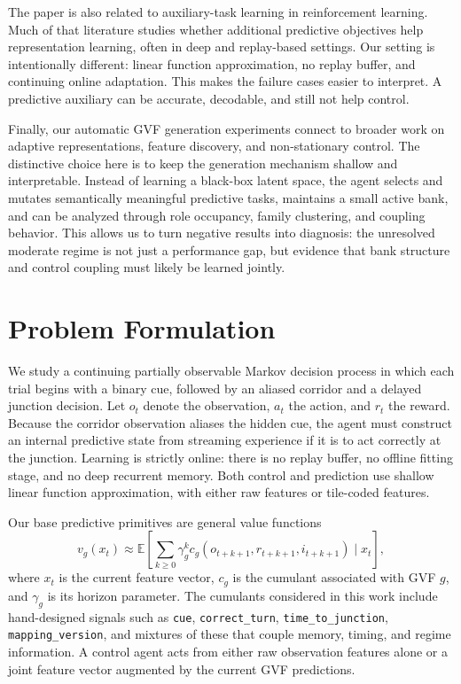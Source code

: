 \documentclass[11pt]{article}
\begin{document}
The paper is also related to auxiliary-task learning in reinforcement learning. Much of that literature studies whether additional predictive objectives help representation learning, often in deep and replay-based settings. Our setting is intentionally different: linear function approximation, no replay buffer, and continuing online adaptation. This makes the failure cases easier to interpret. A predictive auxiliary can be accurate, decodable, and still not help control.

Finally, our automatic GVF generation experiments connect to broader work on adaptive representations, feature discovery, and non-stationary control. The distinctive choice here is to keep the generation mechanism shallow and interpretable. Instead of learning a black-box latent space, the agent selects and mutates semantically meaningful predictive tasks, maintains a small active bank, and can be analyzed through role occupancy, family clustering, and coupling behavior. This allows us to turn negative results into diagnosis: the unresolved moderate regime is not just a performance gap, but evidence that bank structure and control coupling must likely be learned jointly.

\section{Problem Formulation}
We study a continuing partially observable Markov decision process in which each trial begins with a binary cue, followed by an aliased corridor and a delayed junction decision. Let $o_t$ denote the observation, $a_t$ the action, and $r_t$ the reward. Because the corridor observation aliases the hidden cue, the agent must construct an internal predictive state from streaming experience if it is to act correctly at the junction. Learning is strictly online: there is no replay buffer, no offline fitting stage, and no deep recurrent memory. Both control and prediction use shallow linear function approximation, with either raw features or tile-coded features.

Our base predictive primitives are general value functions
\[
v_g(x_t) \approx \mathbb{E}\!\left[\sum_{k \ge 0} \gamma_g^k c_g(o_{t+k+1}, r_{t+k+1}, i_{t+k+1}) \mid x_t\right],
\]
where $x_t$ is the current feature vector, $c_g$ is the cumulant associated with GVF $g$, and $\gamma_g$ is its horizon parameter. The cumulants considered in this work include hand-designed signals such as \texttt{cue}, \texttt{correct\_turn}, \texttt{time\_to\_junction}, \texttt{mapping\_version}, and mixtures of these that couple memory, timing, and regime information. A control agent acts from either raw observation features alone or a joint feature vector augmented by the current GVF predictions.
\end{document}
